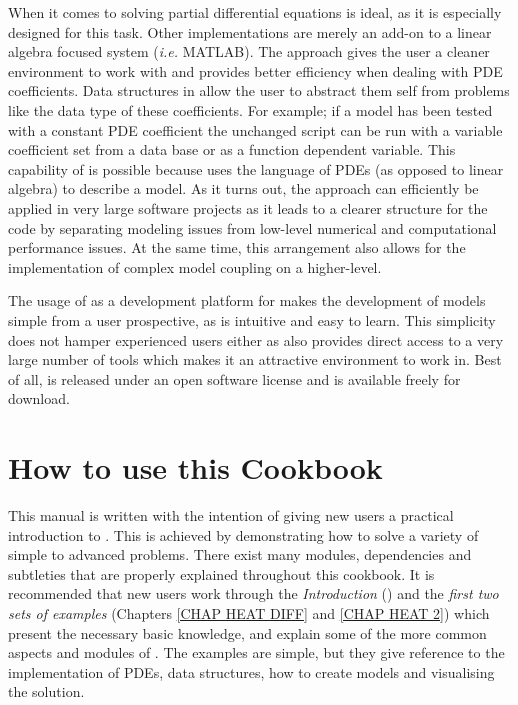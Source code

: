 When it comes to solving partial differential equations \esc is ideal, as it is especially designed for this task. Other implementations are merely an add-on to a linear algebra focused system (\textit{i.e.} MATLAB). The \esc approach gives the user a cleaner environment to work with and provides better efficiency when dealing with PDE coefficients. Data structures in \esc allow the user to abstract them self from problems like the data type of these coefficients. For example; if a model has been tested with a constant PDE coefficient the unchanged script can be run with a variable coefficient set from a data base or as a function dependent variable. This capability of \esc is possible because \esc uses the language of PDEs (as opposed to linear algebra) to describe a model. As it turns out, the \esc approach can efficiently be applied in very large software projects as it leads to a clearer structure for the code by separating modeling issues from low-level numerical and computational performance issues.  At the same time, this arrangement also allows for the implementation of complex model coupling on a higher-level. 

The usage of \pyt as a development platform for \esc makes the development of models  simple from a user prospective, as \pyt is intuitive and easy to learn. This simplicity does not hamper experienced users either as \pyt also provides direct access to a very large number of tools which makes it an attractive environment to work in. Best of all, \esc is released under an open software license and is available freely for download.

\section{How to use this Cookbook}
This manual is written with the intention of giving new users a practical introduction to \esc. This is achieved by demonstrating how to solve a variety of simple to advanced problems. There exist many modules, dependencies and subtleties that are properly explained throughout this cookbook. It is recommended that new users work through the \textit{Introduction} () and the \textit{first two sets of examples} (Chapters \ref{CHAP HEAT DIFF} and \ref{CHAP HEAT 2}) which present the necessary basic knowledge, and explain some of the more common aspects and modules of \esc. The examples are simple, but they give reference to the implementation of PDEs, data structures, how to create models and visualising the solution.


